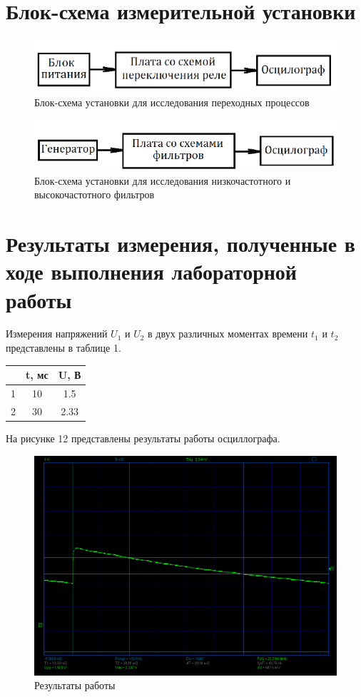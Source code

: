\section{Блок-схема измерительной установки}

\begin{figure}[H]
	\centering
	\includegraphics[width=0.7\linewidth]{img/f10}
	\caption{Блок-схема установки для исследования переходных процессов}
\end{figure}

\begin{figure}[H]
	\centering
	\includegraphics[width=0.7\linewidth]{img/f11}
	\caption{Блок-схема установки для исследования низкочастотного и высокочастотного фильтров}
\end{figure}

\section{Результаты измерения, полученные в ходе выполнения лабораторной работы}

Измерения напряжений $U_1$ и $U_2$ в двух различных моментах времени $t_1$ и $t_2$ представлены в таблице 1.

\begin{table}[H]
	\centering
	\begin{tabular}{|c|c|c|}
		\hline
		& t,  мс & U, В \\ \hline
		1 & 10     & 1.5  \\ \hline
		2 & 30     & 2.33 \\ \hline
	\end{tabular}
\end{table}

На рисунке 12 представлены результаты работы осциллографа.

\begin{figure}[H]
	\centering
	\includegraphics[width=0.7\linewidth]{img/f12}
	\caption{Результаты работы}
\end{figure}





